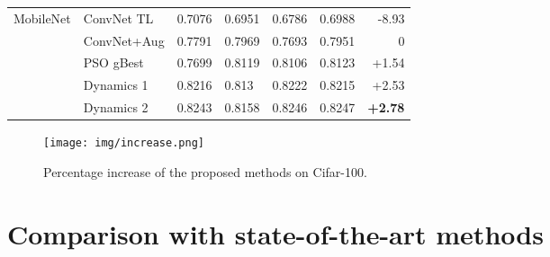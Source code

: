 \documentclass{ieeeaccess}
\begin{document}
\begin{table}[htb!]
{\begin{tabular}{|l|l|l|l|l|l|r|}
\hline
\multirow{5}{*}{MobileNet}                          & ConvNet TL                                     & 0.7076                     & 0.6951                     & 0.6786                     & 0.6988                     & -8.93                           \\ 
\cline{2-7}
                                                    & ConvNet+Aug                                      & 0.7791                     & 0.7969                     & 0.7693                     & 0.7951                     & 0                             \\ 
\cline{2-7}
                                                    & PSO gBest                                    & 0.7699                     & 0.8119                     & 0.8106                     & 0.8123                     & +1.54                           \\ 
\cline{2-7}
                                                    & Dynamics 1                                   & 0.8216                     & 0.813                      & 0.8222                     & 0.8215                     & +2.53                           \\ 
\cline{2-7}
                                                    & Dynamics 2                                   & 0.8243                     & 0.8158                     & 0.8246                     & 0.8247                     & \textbf{+2.78}                           \\
\hline
\end{tabular}
}
\end{table} \begin{figure}[htb!]
\begin{center}
\texttt{[image: img/increase.png]}
\caption{Percentage increase of the proposed methods on Cifar-100.}
\label{fig:increase}
\end{center}
\end{figure}
\section{Comparison with state-of-the-art methods}
\label{sec:stateoftheart}
\end{document}
